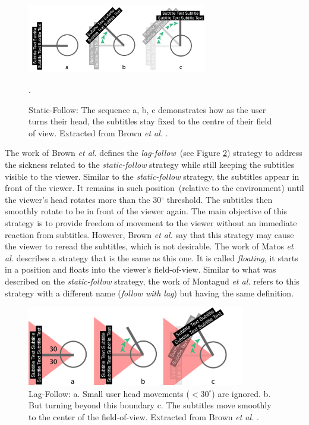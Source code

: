 \begin{figure}[!ht]
    \centering
    \includegraphics[width=0.7\textwidth]{img/video360/static-follow.png}
    \caption{Static-Follow: The sequence a, b, c demonstrates how as the user turns their head, the subtitles stay fixed to the centre of their field of view. Extracted from Brown \emph{et al.} \cite{brown_subtitles_2017}.}.
    \label{fig:static_follow}
\end{figure}

The work of Brown \emph{et al.} \cite{brown_subtitles_2017} defines the \emph{lag-follow}~(see Figure \ref{fig:lag_follow}) strategy to address the sickness related to the \emph{static-follow} strategy while still keeping the subtitles visible to the viewer. Similar to the \emph{static-follow} strategy, the subtitles appear in front of the viewer. It remains in such position~(relative to the environment) until the viewer's head rotates more than the 30$^{\circ}$ threshold. The subtitles then smoothly rotate to be in front of the viewer again. The main objective of this strategy is to provide freedom of movement to the viewer without an immediate reaction from subtitles. However, Brown \emph{et al.} \cite{brown_subtitles_2017} say that this strategy may cause the viewer to reread the subtitles, which is not desirable.
The work of Matos \emph{et al.} \cite{matos_dynamic_2018} describes a strategy that is the same as this one. It is called \emph{floating}, it starts in a position and floats into the viewer's field-of-view. Similar to what was described on the \emph{static-follow} strategy, the work of Montagud \emph{et al.} \cite{montagud_culture_2020} refers to this strategy with a different name (\emph{follow with lag}) but having the same definition.

\begin{figure}[!ht]
    \centering
    \includegraphics[width=0.85\textwidth]{img/video360/lag-follow.png}
    \caption{Lag-Follow: a. Small user head movements ($<30^{\circ}$) are ignored. b. But turning beyond this boundary c. The subtitles move smoothly to the center of the field-of-view. Extracted from Brown \emph{et al.} \cite{brown_subtitles_2017}.}
    \label{fig:lag_follow}
\end{figure}

